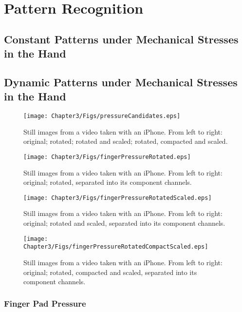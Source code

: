\chapter{Pattern Recognition}

\ifpdf
    \graphicspath{{Chapter3/Figs/Raster/}{Chapter3/Figs/PDF/}{Chapter3/Figs/}}
\else
    \graphicspath{{Chapter3/Figs/Vector/}{Chapter3/Figs/}}
\fi

\section{Constant Patterns under Mechanical Stresses in the Hand}\label{sec:ConstantPatterns}
\section{Dynamic Patterns under Mechanical Stresses in the Hand}\label{sec:DynamicPatterns}
\begin{figure}[h!]
  \caption{Still images from a video taken with an iPhone. From left to right: original; rotated; rotated and scaled; rotated, compacted and scaled.}
  \label{fig:pressureCandidates}
  \centering
    \texttt{[image: Chapter3/Figs/pressureCandidates.eps]}
\end{figure}
\begin{figure}[h!]
  \caption{Still images from a video taken with an iPhone. From left to right: original; rotated, separated into its component channels.}
  \label{fig:pressureCandidates1}
  \centering
    \texttt{[image: Chapter3/Figs/fingerPressureRotated.eps]}
\end{figure}
\begin{figure}[h!]
  \caption{Still images from a video taken with an iPhone. From left to right: original; rotated and scaled, separated into its component channels.}
  \label{fig:pressureCandidates2}
  \centering
    \texttt{[image: Chapter3/Figs/fingerPressureRotatedScaled.eps]}
\end{figure}
\begin{figure}[h!]
  \caption{Still images from a video taken with an iPhone. From left to right: original; rotated, compacted and scaled, separated into its component channels.}
  \label{fig:pressureCandidate3}
  \centering
    \texttt{[image: Chapter3/Figs/fingerPressureRotatedCompactScaled.eps]}
\end{figure}
\subsection{Finger Pad Pressure}\label{sec:FingerPadPressure}
